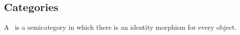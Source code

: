 \subsection{Categories}

\begin{ctdefinition}[Category]
    \label{def:categorymain}
    A \emph{}~\CatC is a semicategory in which there is an identity morphism for every object.
\end{ctdefinition}


